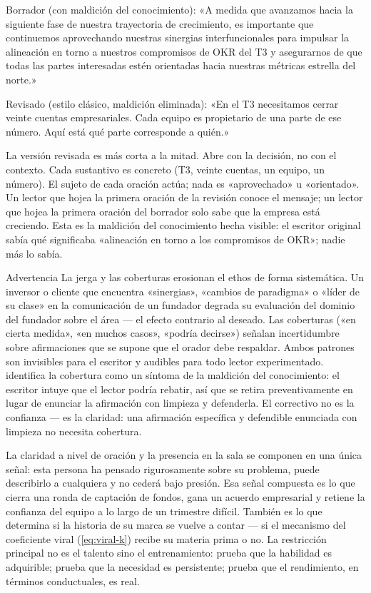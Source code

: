\begin{example}
Borrador (con maldición del conocimiento): «A medida que avanzamos hacia la siguiente fase
de nuestra trayectoria de crecimiento, es importante que continuemos aprovechando nuestras
sinergias interfuncionales para impulsar la alineación en torno a nuestros compromisos de
OKR del T3 y asegurarnos de que todas las partes interesadas estén orientadas hacia nuestras
métricas estrella del norte.»

Revisado (estilo clásico, maldición eliminada): «En el T3 necesitamos cerrar veinte cuentas
empresariales. Cada equipo es propietario de una parte de ese número. Aquí está qué parte
corresponde a quién.»

La versión revisada es más corta a la mitad. Abre con la decisión, no con el contexto. Cada
sustantivo es concreto (T3, veinte cuentas, un equipo, un número). El sujeto de cada oración
actúa; nada es «aprovechado» u «orientado». Un lector que hojea la primera oración de la
revisión conoce el mensaje; un lector que hojea la primera oración del borrador solo sabe
que la empresa está creciendo. Esta es la maldición del conocimiento hecha visible: el escritor
original sabía qué significaba «alineación en torno a los compromisos de OKR»; nadie más lo
sabía.
\end{example}

\begin{admonition}{Advertencia}
La jerga y las coberturas erosionan el ethos de forma sistemática. Un inversor o cliente que
encuentra «sinergias», «cambios de paradigma» o «líder de su clase» en la comunicación de un
fundador degrada su evaluación del dominio del fundador sobre el área — el efecto contrario
al deseado. Las coberturas («en cierta medida», «en muchos casos», «podría decirse») señalan
incertidumbre sobre afirmaciones que se supone que el orador debe respaldar. Ambos patrones
son invisibles para el escritor y audibles para todo lector experimentado.
\textcite{pinker2014senseofstyle} identifica la cobertura como un síntoma de la maldición del
conocimiento: el escritor intuye que el lector podría rebatir, así que se retira
preventivamente en lugar de enunciar la afirmación con limpieza y defenderla. El correctivo
no es la confianza — es la claridad: una afirmación específica y defendible enunciada con
limpieza no necesita cobertura.
\end{admonition}

La claridad a nivel de oración y la presencia en la sala se componen en una única señal: esta
persona ha pensado rigurosamente sobre su problema, puede describirlo a cualquiera y no cederá
bajo presión. Esa señal compuesta es lo que cierra una ronda de captación de fondos, gana un
acuerdo empresarial y retiene la confianza del equipo a lo largo de un trimestre difícil.
También es lo que determina si la historia de su marca se vuelve a contar — si el mecanismo
del coeficiente viral (\cref{eq:viral-k}) recibe su materia prima o no. La restricción
principal no es el talento sino el entrenamiento: \textcite{lacerenza2017training} prueba que
la habilidad es adquirible; \textcite{camerer1989curse} prueba que la necesidad es persistente;
\textcite{braddock2016narrative} prueba que el rendimiento, en términos conductuales, es real.

